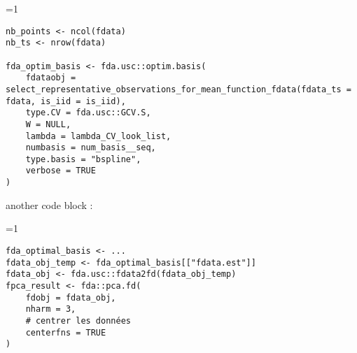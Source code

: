 \ifnum\value{code}=1
	\begin{verbatim}
nb_points <- ncol(fdata)
nb_ts <- nrow(fdata)
 
fda_optim_basis <- fda.usc::optim.basis(
    fdataobj = select_representative_observations_for_mean_function_fdata(fdata_ts = fdata, is_iid = is_iid),
    type.CV = fda.usc::GCV.S,
    W = NULL,
    lambda = lambda_CV_look_list,
    numbasis = num_basis__seq,
    type.basis = "bspline",
    verbose = TRUE
)
\end{verbatim}
\fi

another code block :

\ifnum\value{code}=1
	\begin{verbatim}
fda_optimal_basis <- ...
fdata_obj_temp <- fda_optimal_basis[["fdata.est"]]
fdata_obj <- fda.usc::fdata2fd(fdata_obj_temp)
fpca_result <- fda::pca.fd(
    fdobj = fdata_obj,
    nharm = 3,
    # centrer les données
    centerfns = TRUE
)
\end{verbatim}
\fi
